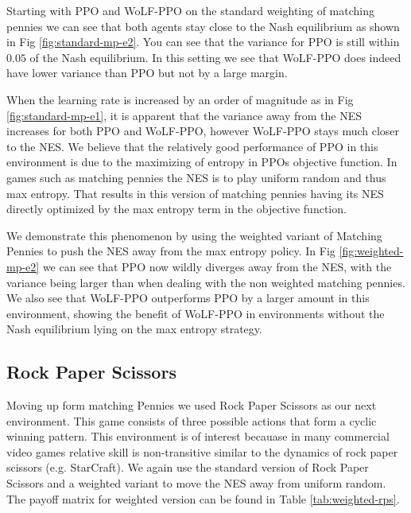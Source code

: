 \documentclass[conference]{IEEEtran}
\begin{document}
Starting with PPO and WoLF-PPO on the standard weighting of matching pennies we can see that both agents stay close to the Nash equilibrium as shown in Fig \ref{fig:standard-mp-e2}. You can see that the variance for PPO is still within $0.05$ of the Nash equilibrium. In this setting we see that WoLF-PPO does indeed have lower variance than PPO but not by a large margin.

When the learning rate is increased by an order of magnitude as in Fig \ref{fig:standard-mp-e1}, it is apparent that the variance away from the NES increases for both PPO and WoLF-PPO, however WoLF-PPO stays much closer to the NES. We believe that the relatively good performance of PPO in this environment is due to the maximizing of entropy in PPOs objective function. In games such as matching pennies the NES is to play uniform random and thus max entropy. That results in this version of matching pennies having its NES directly optimized by the max entropy term in the objective function.

We demonstrate this phenomenon by using the weighted variant of Matching Pennies to push the NES away from the max entropy policy. In Fig \ref{fig:weighted-mp-e2} we can see that PPO now wildly diverges away from the NES, with the variance being larger than when dealing with the non weighted matching pennies. We also see that WoLF-PPO outperforms PPO by a larger amount in this environment, showing the benefit of WoLF-PPO in environments without the Nash equilibrium lying on the max entropy strategy.

\subsection{Rock Paper Scissors}

Moving up form matching Pennies we used Rock Paper Scissors as our next environment. This game consists of three possible actions that form a cyclic winning pattern. This environment is of interest becauase in many commercial video games relative skill is non-transitive similar to the dynamics of rock paper scissors (e.g. StarCraft\cite{balduzzi2019open}). We again use the standard version of Rock Paper Scissors and a weighted variant to move the NES away from uniform random. The payoff matrix for weighted version can be found in Table \ref{tab:weighted-rps}.
\end{document}
